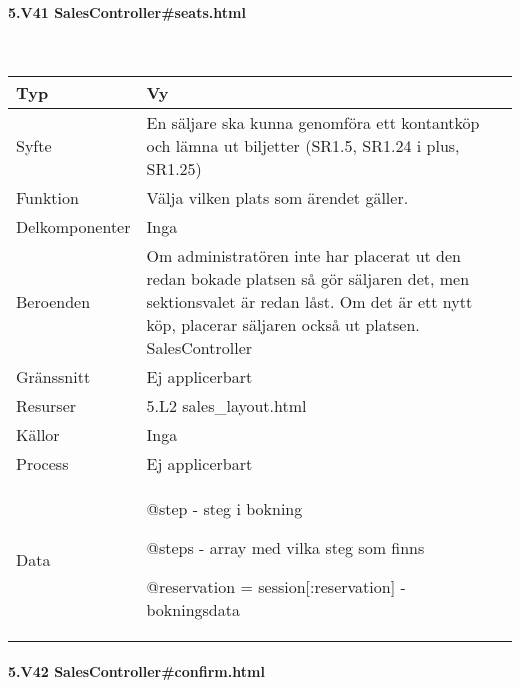 \documentclass[a4paper, twoside, 11pt, titlepage]{article}
\begin{document}
			\paragraph{5.V41 SalesController\#seats.html}\

			\begin {table} [ht] \begin{tabular} {  p{3.5cm} p{9.6cm} }
				\hline
				{Typ} & {Vy} \\
				\hline
				{Syfte} & {En säljare ska kunna genomföra ett kontantköp och lämna ut biljetter (SR1.5, SR1.24 i plus, SR1.25)} \\
				\hline
				{Funktion} & {Välja vilken plats som ärendet gäller.} \\
				\hline
				{Delkomponenter} & {Inga} \\
				\hline
				{Beroenden} & {Om administratören inte har placerat ut den redan bokade platsen så gör säljaren det, men sektionsvalet är redan låst. Om det är ett nytt köp, placerar säljaren också ut platsen. SalesController} \\
				\hline
				{Gränssnitt} & {Ej applicerbart} \\
				\hline
				{Resurser} & {5.L2 sales\_layout.html} \\
				\hline
				{Källor} & {Inga} \\
				\hline
				{Process} & {Ej applicerbart} \\
				\hline
				{Data} & {@step - steg i bokning

@steps - array med vilka steg som finns

@reservation = session[:reservation] - bokningsdata} \\
				\hline
			\end{tabular} \end{table} \FloatBarrier


			\paragraph{5.V42 SalesController\#confirm.html}\
\end{document}
